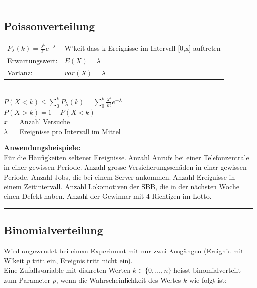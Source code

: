 \hrule \hspace{3mm}

	\subsection{Poissonverteilung \skript{\pageref{sk-section-poissonverteilung}}}
	\begin{multicols}{2}
		\begin{tabular}{ll}
        $P_\lambda(k)=\frac{\lambda^k}{k!}e^{-\lambda}$ &
         \parbox{4cm}{W'keit dass k Ereignisse im Intervall [0,x] auftreten} \\
        Erwartungswert:  & $E(X)=\lambda$\\
        Varianz:  & $var(X)=\lambda$ \\
        \end{tabular} \\
         $P(X<k) \leq \sum_0^k P_\lambda(k)=\sum_0^k \frac{\lambda^k}{k!}e^{-\lambda}$ \\
         $P(X>k) = 1-P(X<k)$ \\
        $x =$ Anzahl Versuche\\
        $\lambda =$ Ereignisse pro Intervall im Mittel
        \columnbreak
        
        {\bf Anwendungsbeispiele:} \\ Für die Häufigkeiten seltener
        Ereignisse. Anzahl Anrufe bei einer Telefonzentrale in einer gewissen
        Periode. Anzahl grosse Versicherungsschäden in einer gewissen Periode.
        Anzahl Jobs, die bei einem Server ankommen. Anzahl Ereignisse in
        einem Zeitintervall. Anzahl Lokomotiven der SBB, die in der nächsten Woche 
        einen Defekt haben. Anzahl der Gewinner mit 4 Richtigen im Lotto.
     \end{multicols}
        
\hrule
	\subsection{Binomialverteilung \skript{\pageref{sk-section-binomialverteilung}}}
		
    	Wird angewendet bei einem Experiment mit nur zwei Ausgängen (Ereignis mit W'keit $p$ tritt
    	ein, Ereignis tritt nicht ein). \\
    	Eine Zufallsvariable mit diskreten Werten $k \in \{
    	0,\ldots,n \}$ heisst binomialverteilt zum Parameter $p$, wenn die
        Wahrscheinlichkeit des Wertes $k$ wie folgt ist:


